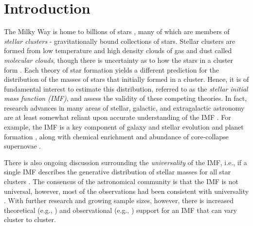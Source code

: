 \documentclass[ejs]{imsart}
\numberwithin{equation}{section}
\theoremstyle{plain}
\begin{document}
\section{Introduction}
\label{introSec}
The Milky Way is home to billions of stars \citep{McMillan:2016uq}, many of which 
are members of \emph{stellar clusters} - gravitationally bound collections of stars. 
Stellar clusters are formed from low temperature and high density clouds of gas and dust 
called \emph{molecular clouds}, though there 
is uncertainty as to how the stars in a cluster form \citep{Beccari2017}. 
Each theory of star formation yields a different prediction for the distribution
of the masses of stars that initially formed in a cluster. Hence, it is of fundamental 
interest to estimate this distribution, referred to as the \emph{stellar initial mass function (IMF)},
and assess the validity of these competing theories.
In fact, research advances in many areas of stellar, galactic, and extragalactic astronomy are at 
least somewhat reliant upon accurate understanding of the IMF \citep{bastian2010}.
For example, the IMF is a key
component of galaxy and stellar evolution and planet formation \citep{bally2005, bastian2010, Shetty2014}, 
along with chemical enrichment and abundance of core-collapse supernovae \citep{weisz13}.

There is also ongoing discussion surrounding the {\it universality} of the IMF, i.e.,
if a single IMF describes the generative distribution of stellar masses for all
star clusters \citep{bastian2010}. The consensus of the astronomical community is that the IMF is not universal, however, most of the observations had been consistent with universality \citep{kroupa2001, bastian2010, Ashworth2017}.
With further research and growing sample sizes, however, there is increased theoretical 
(e.g., \citealt{bonnell2006, Dib2010})
and observational
(e.g., \citealt{Treu2010, Dokkum:2010fk, Spiniello2014,Geha2013, Dib2017})
support for an IMF that can vary cluster to cluster. %
\end{document}
